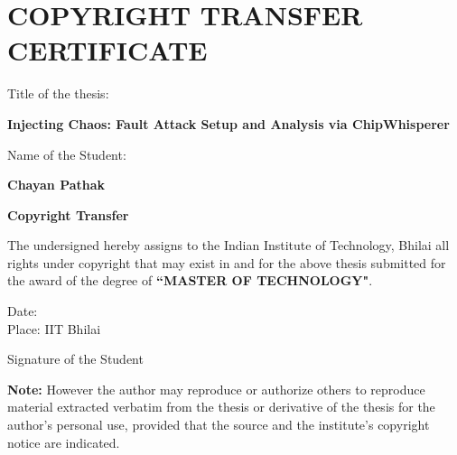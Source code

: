 \chapter*{COPYRIGHT TRANSFER CERTIFICATE}
\thispagestyle{myHeader}

\noindent
\begin{minipage}[c]{0.4\linewidth}
Title of the thesis: \\
\end{minipage} %
\begin{minipage}[c]{0.6\linewidth}
\textbf{Injecting Chaos: Fault Attack Setup
and Analysis via ChipWhisperer}\\
\end{minipage}
\vspace{2em}
\noindent
\begin{minipage}[c]{0.4\linewidth}
Name of the Student:
\end{minipage} %
\vspace{2em}
\begin{minipage}[c]{0.6\linewidth}
\textbf{Chayan Pathak}\\
\end{minipage}
\begin{center}
    \textbf{Copyright Transfer}
\end{center}
\vspace{1.5em}

The undersigned hereby assigns to the Indian Institute of Technology, Bhilai all rights under copyright that may exist in and for the above thesis submitted for the award of the degree of \textbf{``MASTER OF TECHNOLOGY"}.\\

\vspace{2em}
\noindent
\begin{minipage}[c]{0.7\linewidth}
Date: \\
Place: IIT Bhilai\\
\end{minipage} 
\begin{minipage}[c]{0.5\linewidth}
Signature of the Student
\end{minipage}

\textbf{Note:} However the author may reproduce or authorize others to reproduce material extracted verbatim from the thesis or derivative of the thesis for the author's personal use, provided that the source and the institute's copyright notice are indicated.